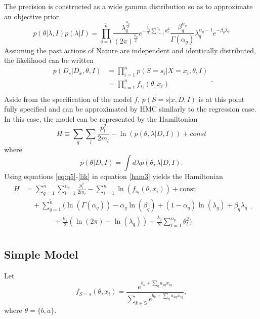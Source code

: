 \begin{example}
\begin{equation}
		\label{eq:lambda}
	\end{equation}
	The precision is constructed as a wide gamma distribution so as to approximate an objective prior
	\begin{equation}
		p(\theta|\lambda,I)p(\lambda|I)
		= \prod_{q=1}^{\tilde{n}} \frac{\lambda_q^\frac{n_q}{2}}{(2\pi)^\frac{n_q}{2}}e^{-\frac{\lambda_q}{2}\sum_{l=1}^{n_q}\theta_l^2}\frac{\beta_q^{\alpha_q}}{\Gamma(\alpha_q)}\lambda_q^{\alpha_q-1}e^{-\beta_q \lambda_q}
		\label{eq:prior}
	\end{equation}
	Assuming the past actions of Nature are independent and identically distributed, the likelihood can be written 
	\begin{equation}
		\begin{split}
			p(D_s|D_x,\theta,I) &=\prod_{i=1}^{n}p(S = s_i|X = x_i,\theta,I)\\
			&=\prod_{i=1}^{n}f_{s_i}(\theta,x_i)\\
		\end{split}.
		\label{lik}
	\end{equation}
	Aside from the specification of the model $f$, $p(S= s|x,D,I)$ is at this point fully specified and can be approximated by HMC similarly to the regression case. In this case, the model can be represented by the Hamiltonian 
	\begin{equation}
		H \equiv  \sum_{q}\sum_{l}\frac{p_{l}^2}{2m_{l}}-\ln(p(\theta,\lambda|D,I))+const
		\label{ham3}
	\end{equation}
	where
	\begin{equation}
		p(\theta|D,I) = \int d\lambda p(\theta,\lambda|D,I).
	\end{equation}
	Using equations \eqref{eq:q5}-\eqref{lik} in equation \eqref{ham3} yields the Hamiltonian
	\begin{equation}
		\begin{split}
			H&=\sum_{q=1}^{\tilde{n}}\sum_{l=1}^{n_q}\frac{p_{l}^2}{2m_{l}}-\sum_{i=1}^{n}\ln(f_{s_i}(\theta,x_i))+\text{const}\\
			&\quad+\sum_{q=1}^{\tilde{n}}\bigg(\ln(\Gamma(\alpha_q))-\alpha_q\ln(\beta_q)+(1-\alpha_q)\ln(\lambda_q)+\beta_q\lambda_q\\
			&\qquad \qquad+\frac{n_q}{2}(\ln(2\pi)-\ln(\lambda_q))+\frac{\lambda_q}{2}\sum_{l=1}^{n_q}\theta_l^2\bigg)\\
		\end{split}.
		\label{ham2}
	\end{equation}
	
	\subsection{Simple Model}
	Let
	\begin{equation}
		f_{S = s}(\theta,x_i) = \frac{e^{b_s+\sum_{q}a_{sq}x_{iq}}}{\sum_{k\in \mathbb{S}}e^{b_k+\sum_{q}a_{kq}x_{iq}}},
		\label{eq:f1}
	\end{equation}
	where $\theta = \{b,a\}$.
	

\end{example}
